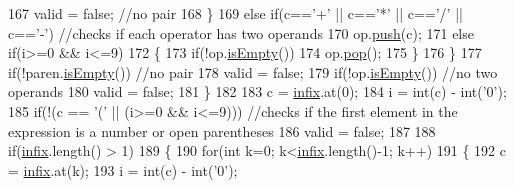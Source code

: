 \begin{DoxyCode}
167                valid = \textcolor{keyword}{false}; \textcolor{comment}{//no pair                                                                    
                                                                                                       }
168          \}
169          \textcolor{keywordflow}{else} \textcolor{keywordflow}{if}(c==\textcolor{charliteral}{'+'} || c==\textcolor{charliteral}{'*'} || c==\textcolor{charliteral}{'/'} || c==\textcolor{charliteral}{'-'}) \textcolor{comment}{//checks if each operator has two operands          
                                                                                                       }
170             op.\hyperlink{classStack_a3553a0aa2c9640c5266e4d8790863e2e}{push}(c);
171          \textcolor{keywordflow}{else} \textcolor{keywordflow}{if}(i>=0 && i<=9)
172          \{
173             \textcolor{keywordflow}{if}(!op.\hyperlink{classStack_ad0db0d9b249e871bb7504ed89a99d3a7}{isEmpty}())
174                op.\hyperlink{classStack_a2723aec5c7e2611b97fcffeb7709de33}{pop}();
175          \}
176       \}
177       \textcolor{keywordflow}{if}(!paren.\hyperlink{classStack_ad0db0d9b249e871bb7504ed89a99d3a7}{isEmpty}()) \textcolor{comment}{//no pair                                                                
                                                                                                              }
178          valid = \textcolor{keyword}{false};
179       \textcolor{keywordflow}{if}(!op.\hyperlink{classStack_ad0db0d9b249e871bb7504ed89a99d3a7}{isEmpty}()) \textcolor{comment}{//no two operands        }
180          valid = \textcolor{keyword}{false};
181    \}
182 
183    c = \hyperlink{classAlgebraicExpression_ac9a5d8af4bd13370e7f2cb66b0f1daa2}{infix}.at(0);
184    i = int(c) - int(\textcolor{charliteral}{'0'});
185    \textcolor{keywordflow}{if}(!(c == \textcolor{charliteral}{'('} || (i>=0 && i<=9))) \textcolor{comment}{//checks if the first element in the expression is a number or open
       parentheses                                                                                        }
186       valid = \textcolor{keyword}{false};
187 
188    \textcolor{keywordflow}{if}(\hyperlink{classAlgebraicExpression_ac9a5d8af4bd13370e7f2cb66b0f1daa2}{infix}.length() > 1)
189    \{
190       \textcolor{keywordflow}{for}(\textcolor{keywordtype}{int} k=0; k<\hyperlink{classAlgebraicExpression_ac9a5d8af4bd13370e7f2cb66b0f1daa2}{infix}.length()-1; k++)
191       \{
192          c = \hyperlink{classAlgebraicExpression_ac9a5d8af4bd13370e7f2cb66b0f1daa2}{infix}.at(k);
193          i = int(c) - int(\textcolor{charliteral}{'0'});

\end{DoxyCode}
